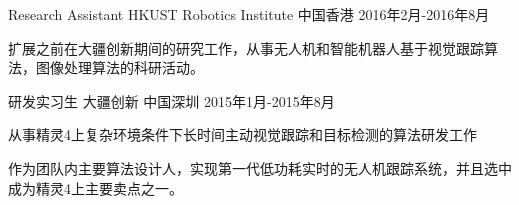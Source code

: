 \begin{cventries}
  \cventry
    {Research Assistant} %
    {HKUST Robotics Institute} %
    {中国香港} %
    {2016年2月-2016年8月} %
    {
      \begin{cvitems} %
        \item {扩展之前在大疆创新期间的研究工作，从事无人机和智能机器人基于视觉跟踪算法，图像处理算法的科研活动。}
      \end{cvitems}
    }

  \cventry
    {研发实习生} %
    {大疆创新} %
    {中国深圳} %
    {2015年1月-2015年8月} %
    {
      \begin{cvitems} %
        \item {从事精灵4上复杂环境条件下长时间主动视觉跟踪和目标检测的算法研发工作}
        \item {作为团队内主要算法设计人，实现第一代低功耗实时的无人机跟踪系统，并且选中成为精灵4上主要卖点之一。}
      \end{cvitems}
    }


\end{cventries}
